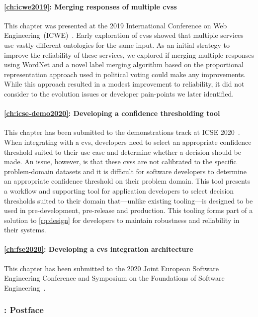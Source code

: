 \paragraph{\cref{ch:icwe2019}: Merging responses of multiple \glspl{cvs}} This chapter was presented at the 2019 International Conference on Web Engineering~(ICWE)~\citep{Ohtake:2019vi}. Early exploration of \glspl{cvs} showed that multiple services use vastly different ontologies for the same input. As an initial strategy to improve the reliability of these services, we explored if merging multiple responses using WordNet \citep{WordNetMiller1995} and a novel label merging algorithm based on the proportional representation approach used in political voting could make any improvements. While this approach resulted in a modest improvement to reliability, it did not consider to the evolution issues or developer pain-points we later identified.

\paragraph{\cref{ch:icse-demo2020}: Developing a confidence thresholding tool} This chapter has been submitted to the demonstrations track at ICSE 2020~\citep{Cummaudo:2020icse-demo}. When integrating with a \gls{cvs}, developers need to select an appropriate confidence threshold suited to their use case and determine whether a decision should be made. An issue, however, is that these \glspl{cvs} are not calibrated to the specific problem-domain datasets and it is difficult for software developers to determine an appropriate confidence threshold on their problem domain. This tool presents a workflow and supporting tool for application developers to select decision thresholds suited to their domain that---unlike existing tooling---is designed to be used in pre-development, pre-release and production. This tooling forms part of a solution to \ref{rq:design} for developers to maintain robustness and reliability in their systems.

\paragraph{\cref{ch:fse2020}: Developing a \gls{cvs} integration architecture} This chapter has been submitted to the 2020 Joint European Software Engineering Conference and Symposium on the Foundations of Software Engineering~\citep{Cummaudo:2020esecfse}. 

\subsubsection{: Postface}


